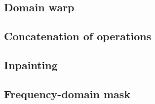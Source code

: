\subsection{Domain warp}

\subsection{Concatenation of operations}

\subsection{Inpainting}

\subsection{Frequency-domain mask}



